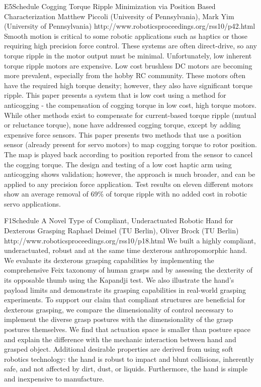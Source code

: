 \begin{spacing}{1.0}
\descriptionPaper
{E5}{Schedule}
{	
Cogging Torque Ripple Minimization via Position Based Characterization
}
{
Matthew Piccoli (University of Pennsylvania), Mark Yim (University of Pennsylvania)
}
{
http://www.roboticsproceedings.org/rss10/p42.html
}
{
Smooth motion is critical to some robotic applications such as haptics or those requiring high precision force control. These systems are often direct-drive, so any torque ripple in the motor output must be minimal. Unfortunately, low inherent torque ripple motors are expensive. Low cost brushless DC motors are becoming more prevalent, especially from the hobby RC community. These motors often have the required high torque density; however, they also have significant torque ripple. This paper presents a system that is low cost using a method for anticogging - the compensation of cogging torque in low cost, high torque motors. While other methods exist to compensate for current-based torque ripple (mutual or reluctance torque), none have addressed cogging torque, except by adding expensive force sensors. This paper presents two methods that use a position sensor (already present for servo motors) to map cogging torque to rotor position. The map is played back according to position reported from the sensor to cancel the cogging torque. The design and testing of a low cost haptic arm using anticogging shows validation; however, the approach is much broader, and can be applied to any precision force application. Test results on eleven different motors show an average removal of 69\% of torque ripple with no added cost in robotic servo applications.
}





\descriptionPaper
{F1}{Schedule}
{	
A Novel Type of Compliant, Underactuated Robotic Hand for Dexterous Grasping 
}
{
Raphael Deimel (TU Berlin), Oliver Brock (TU Berlin)
}
{
http://www.roboticsproceedings.org/rss10/p18.html
}
{
We built a highly compliant, underactuated, robust and at the same time dexterous anthropomorphic hand. We evaluate its dexterous grasping capabilities by implementing the comprehensive Feix taxonomy of human grasps and by assessing the dexterity of its opposable thumb using the Kapandji test. We also illustrate the hand's payload limits and demonstrate its grasping capabilities in real-world grasping experiments. To support our claim that compliant structures are beneficial for dexterous grasping, we compare the dimensionality of control necessary to implement the diverse grasp postures with the dimensionality of the grasp postures themselves. We find that actuation space is smaller than posture space and explain the difference with the mechanic interaction between hand and grasped object. Additional desirable properties are derived from using soft robotics technology: the hand is robust to impact and blunt collisions, inherently safe, and not affected by dirt, dust, or liquids. Furthermore, the hand is simple and inexpensive to manufacture.
}




\end{spacing}
